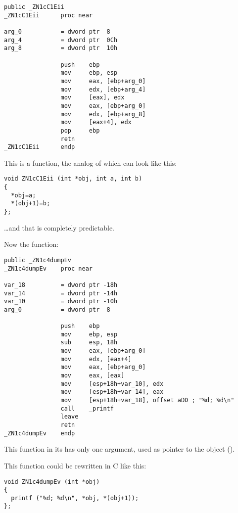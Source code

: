 \begin{lstlisting}[style=customasmx86]
                public _ZN1cC1Eii
_ZN1cC1Eii      proc near

arg_0           = dword ptr  8
arg_4           = dword ptr  0Ch
arg_8           = dword ptr  10h

                push    ebp
                mov     ebp, esp
                mov     eax, [ebp+arg_0]
                mov     edx, [ebp+arg_4]
                mov     [eax], edx
                mov     eax, [ebp+arg_0]
                mov     edx, [ebp+arg_8]
                mov     [eax+4], edx
                pop     ebp
                retn
_ZN1cC1Eii      endp
\end{lstlisting}

This is a function, the analog of which can look like this:

\begin{lstlisting}[style=customc]
void ZN1cC1Eii (int *obj, int a, int b)
{
  *obj=a;
  *(obj+1)=b;
};
\end{lstlisting}

\dots and that is completely predictable.

Now the  function:

\begin{lstlisting}[style=customasmx86]
                public _ZN1c4dumpEv
_ZN1c4dumpEv    proc near

var_18          = dword ptr -18h
var_14          = dword ptr -14h
var_10          = dword ptr -10h
arg_0           = dword ptr  8

                push    ebp
                mov     ebp, esp
                sub     esp, 18h
                mov     eax, [ebp+arg_0]
                mov     edx, [eax+4]
                mov     eax, [ebp+arg_0]
                mov     eax, [eax]
                mov     [esp+18h+var_10], edx
                mov     [esp+18h+var_14], eax
                mov     [esp+18h+var_18], offset aDD ; "%d; %d\n"
                call    _printf
                leave
                retn
_ZN1c4dumpEv    endp
\end{lstlisting}

This function in its  has only one argument, 
used as pointer to the object (\ITthis).

This function could be rewritten in C like this:

\begin{lstlisting}[style=customc]
void ZN1c4dumpEv (int *obj)
{
  printf ("%d; %d\n", *obj, *(obj+1));
};
\end{lstlisting}

